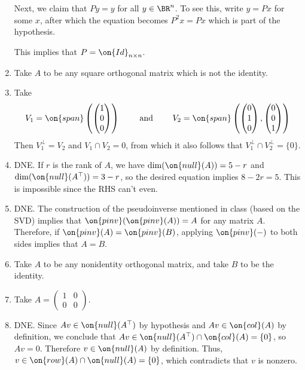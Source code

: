 \documentclass[10pt]{amsart}
\theoremstyle{mythm}
\theoremstyle{definition}
\theoremstyle{myrmk}
\newcounter{part-count}
\begin{document}
\begin{enumerate}
		Next, we claim that $Py = y$ for all $y \in \BR^n$. To see this, write $y = Px$ for some $x$, after which the equation becomes $P^2x = Px$ which is part of the hypothesis. 
		
		This implies that $P = \on{Id}_{n \times n}$. 
		\item Take $A$ to be any square orthogonal matrix which is not the identity. 
		\item Take 
		\[
			V_1 = \on{span}\left( \begin{pmatrix}
			1 \\ 0 \\ 0
			\end{pmatrix} \right) \qquad \text{ and } \qquad V_2 = \on{span}\left( \begin{pmatrix}
			0 \\ 1 \\ 0
			\end{pmatrix}, \begin{pmatrix}
			0 \\ 0 \\ 1 
			\end{pmatrix}\right)
		\]
		Then $V_1^\perp = V_2$ and $V_1 \cap V_2 = 0$, from which it also follows that $V_1^\perp \cap V_2^\perp = \{0\}$. 
		\item DNE. If $r$ is the rank of $A$, we have $\dim(\on{null}(A)) = 5-r$ and $\dim(\on{null}(A^\top)) = 3-r$, so the desired equation implies $8-2r=5$. This is impossible since the RHS can't even. 
		\item DNE. The construction of the pseudoinverse mentioned in class (based on the SVD) implies that $\on{pinv}(\on{pinv}(A)) = A$ for any matrix $A$. Therefore, if $\on{pinv}(A) = \on{pinv}(B)$, applying $\on{pinv}(-)$ to both sides implies that $A = B$. 
		\item Take $A$ to be any nonidentity orthogonal matrix, and take $B$ to be the identity. 
		\item Take $A = \begin{pmatrix}
		1 & 0 \\ 0 & 0 
		\end{pmatrix}$. 
		\item DNE. Since $Av \in \on{null}(A^\top)$ by hypothesis and $Av \in \on{col}(A)$ by definition, we conclude that $Av \in \on{null}(A^\top) \cap \on{col}(A) = \{0\}$, so $Av = 0$. Therefore $v \in \on{null}(A)$ by definition. Thus, $v \in \on{row}(A) \cap \on{null}(A) = \{0\}$, which contradicts that $v$ is nonzero. 
	\end{enumerate} 
	
\end{document}
